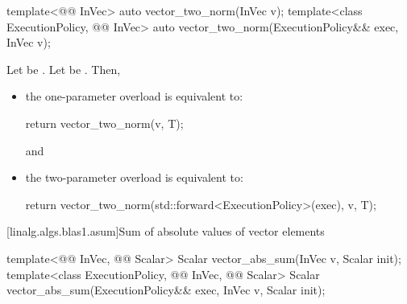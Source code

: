%
\begin{itemdecl}
template<@@ InVec>
  auto vector_two_norm(InVec v);
template<class ExecutionPolicy, @@ InVec>
  auto vector_two_norm(ExecutionPolicy&& exec, InVec v);
\end{itemdecl}

\begin{itemdescr}
\pnum
\effects
Let  be
.
Let  be .
Then,
\begin{itemize}
\item
the one-parameter overload is equivalent to:
\begin{codeblock}
return vector_two_norm(v, T{});
\end{codeblock}
and
\item
the two-parameter overload is equivalent to:
\begin{codeblock}
return vector_two_norm(std::forward<ExecutionPolicy>(exec), v, T{});
\end{codeblock}
\end{itemize}
\end{itemdescr}

[linalg.algs.blas1.asum]{Sum of absolute values of vector elements}

%
\begin{itemdecl}
template<@@ InVec, @@ Scalar>
  Scalar vector_abs_sum(InVec v, Scalar init);
template<class ExecutionPolicy, @@ InVec, @@ Scalar>
  Scalar vector_abs_sum(ExecutionPolicy&& exec, InVec v, Scalar init);
\end{itemdecl}

